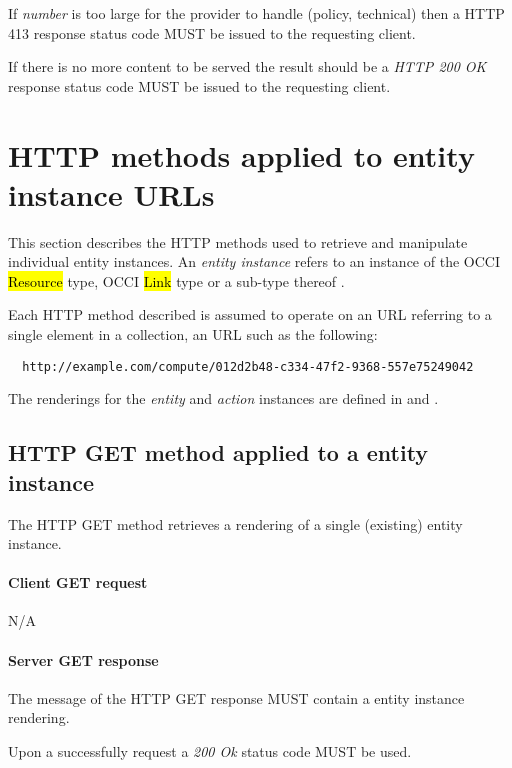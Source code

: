 \documentclass[10pt,a4paper]{article}
\begin{document}

If {\em number} is too large for the provider to handle (policy, technical) then a HTTP 413 response status code MUST be issued to the requesting client.

If there is no more content to be served the result should be a \emph{HTTP 200 OK} response status code MUST be issued to the requesting client.

\section{HTTP methods applied to entity instance URLs}


This section describes the HTTP methods used to retrieve and manipulate
individual entity instances. An {\em entity instance} refers to an instance
of the OCCI \hl{Resource} type, OCCI \hl{Link} type or a sub-type thereof
\cite{occi:core}.

Each HTTP method described is assumed to operate
on an URL referring to a single element in a collection, an URL such as the
following:
\begin{verbatim}
  http://example.com/compute/012d2b48-c334-47f2-9368-557e75249042
\end{verbatim}

The renderings for the {\em entity} and {\em action} instances are defined in \cite{occi:text} and \cite{occi:json}.

\subsection{HTTP GET method applied to a entity instance}
The HTTP GET method retrieves a rendering of a single (existing) entity instance.

\paragraph{Client GET request}
N/A

\paragraph{Server GET response}
The message of the HTTP GET response MUST contain a entity instance rendering.

Upon a successfully request a \emph{200 Ok} status code MUST be used.
\end{document}
